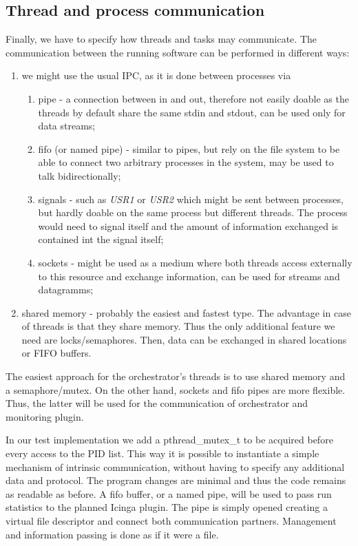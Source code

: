 \documentclass[]{scrartcl}
\begin{document}
\subsection{Thread and process communication}

Finally, we have to specify how threads and tasks may communicate.
The communication between the running software can be performed in different ways:

\begin{enumerate}
	\item we might use the usual IPC, as it is done between processes via
	\begin{enumerate}
		\item pipe - a connection between in and out, therefore not easily doable as the threads by default share the same stdin and stdout, can be used only for data streams;
		\item fifo (or named pipe) - similar to pipes, but rely on the file system to be able to connect two arbitrary processes in the system, may be used to talk bidirectionally; %
		\item signals - such as \textit{USR1} or \textit{USR2} which might be sent between processes, but hardly doable on the same process but different threads. The process would need to signal itself and the amount of information exchanged is contained int the signal itself;
		\item sockets - might be used as a medium where both threads access externally to this resource and exchange information, can be used for streams and datagramms;
	\end{enumerate}
	\item shared memory - probably the easiest and fastest type. The advantage in case of threads is that they share memory. Thus the only additional feature we need are locks/semaphores. Then, data can be exchanged in shared locations or FIFO buffers.
\end{enumerate}
The easiest approach for the orchestrator's threads is to use shared memory and a semaphore/mutex. 
On the other hand, sockets and fifo pipes are more flexible. Thus, the latter will be used for the communication of orchestrator and monitoring plugin.

In our test implementation we add a pthread\_mutex\_t to be acquired before every access to the PID list.
This way it is possible to instantiate a simple mechanism of intrinsic communication, without having to specify any additional data and protocol.
The program changes are minimal and thus the code remains as readable as before.
A fifo buffer, or a named pipe, will be used to pass run statistics to the planned Icinga plugin.
The pipe is simply opened creating a virtual file descriptor and connect both communication partners.  Management and information passing is done as if it were a file.
\end{document}
